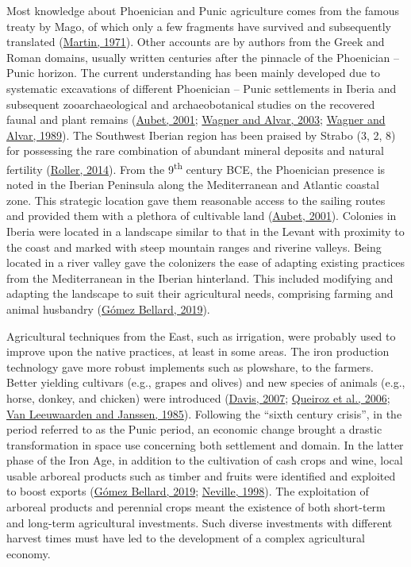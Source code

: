 \documentclass[3p]{elsarticle} %
\begin{document}
Most knowledge about Phoenician and Punic agriculture comes from the famous treaty by Mago, of which only a few fragments have survived and subsequently translated (\protect\hyperlink{ref-martin71}{Martin, 1971}). Other accounts are by authors from the Greek and Roman domains, usually written centuries after the pinnacle of the Phoenician -- Punic horizon. The current understanding has been mainly developed due to systematic excavations of different Phoenician -- Punic settlements in Iberia and subsequent zooarchaeological and archaeobotanical studies on the recovered faunal and plant remains (\protect\hyperlink{ref-aubet01}{Aubet, 2001}; \protect\hyperlink{ref-wagner_alvar03}{Wagner and Alvar, 2003}; \protect\hyperlink{ref-wagner_alvar89}{Wagner and Alvar, 1989}). The Southwest Iberian region has been praised by Strabo (3, 2, 8) for possessing the rare combination of abundant mineral deposits and natural fertility (\protect\hyperlink{ref-roller14}{Roller, 2014}). From the 9\textsuperscript{th} century BCE, the Phoenician presence is noted in the Iberian Peninsula along the Mediterranean and Atlantic coastal zone. This strategic location gave them reasonable access to the sailing routes and provided them with a plethora of cultivable land (\protect\hyperlink{ref-aubet01}{Aubet, 2001}). Colonies in Iberia were located in a landscape similar to that in the Levant with proximity to the coast and marked with steep mountain ranges and riverine valleys. Being located in a river valley gave the colonizers the ease of adapting existing practices from the Mediterranean in the Iberian hinterland. This included modifying and adapting the landscape to suit their agricultural needs, comprising farming and animal husbandry (\protect\hyperlink{ref-gomezbellard19}{Gómez Bellard, 2019}).

Agricultural techniques from the East, such as irrigation, were probably used to improve upon the native practices, at least in some areas. The iron production technology gave more robust implements such as plowshare, to the farmers. Better yielding cultivars (e.g., grapes and olives) and new species of animals (e.g., horse, donkey, and chicken) were introduced (\protect\hyperlink{ref-davis07}{Davis, 2007}; \protect\hyperlink{ref-queiroz_etal06}{Queiroz et al., 2006}; \protect\hyperlink{ref-vanleeuwaarden_janssen85}{Van Leeuwaarden and Janssen, 1985}). Following the ``sixth century crisis'', in the period referred to as the Punic period, an economic change brought a drastic transformation in space use concerning both settlement and domain. In the latter phase of the Iron Age, in addition to the cultivation of cash crops and wine, local usable arboreal products such as timber and fruits were identified and exploited to boost exports (\protect\hyperlink{ref-gomezbellard19}{Gómez Bellard, 2019}; \protect\hyperlink{ref-neville98}{Neville, 1998}). The exploitation of arboreal products and perennial crops meant the existence of both short-term and long-term agricultural investments. Such diverse investments with different harvest times must have led to the development of a complex agricultural economy.
\end{document}
